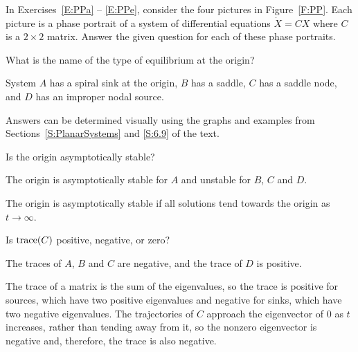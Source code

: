 \documentclass{ximera}
\begin{document}
\noindent In Exercises~\ref{E:PPa} -- \ref{E:PPe}, consider the four pictures
in Figure~\ref{F:PP}.  Each picture is a phase portrait of a system of
differential equations $\dot{X}=CX$ where $C$ is a $2\times 2$ matrix.  Answer
the given question for each of these phase portraits.
\begin{exercise}  \label{E:PPa}
What is the name of the type of equilibrium at the origin?

\begin{solution}
\ans System $A$ has a spiral sink at the origin, $B$ has a
saddle, $C$ has a saddle node, and $D$ has an improper nodal source.

\soln Answers can be determined visually using the graphs and examples
from Sections~\ref{S:PlanarSystems} and \ref{S:6.9} of the text.

\end{solution}
\end{exercise}
\begin{exercise}  \label{E:PPb}
Is the origin asymptotically stable?

\begin{solution}
\ans The origin is asymptotically stable for $A$ and unstable
for $B$, $C$ and $D$.

\soln The origin is asymptotically stable if all solutions tend towards
the origin as $t \rightarrow \infty$.

\end{solution}
\end{exercise}
\begin{exercise}  \label{E:PPc}
Is ${\rm trace}(C)$ positive, negative, or zero?

\begin{solution}
\ans The traces of $A$, $B$ and $C$ are negative, and the
trace of $D$ is positive.

\soln The trace of a matrix is the sum of the eigenvalues, so the trace
is positive for sources, which have two positive eigenvalues and
negative for sinks, which have two negative eigenvalues.  The trajectories
of $C$ approach the eigenvector of $0$ as $t$ increases, rather
than tending away from it, so the nonzero eigenvector is negative and,
therefore, the trace is also negative.

\end{solution}
\end{exercise}
\end{document}
